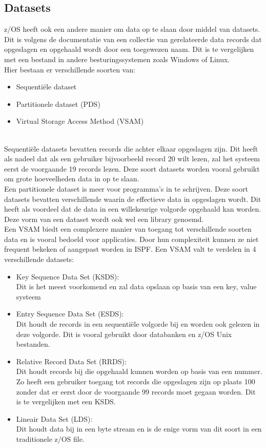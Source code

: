 \subsection{Datasets}
z/OS heeft ook een andere manier om data op te slaan door middel van datasets. Dit is volgens de documentatie van \textcite{IBM} een collectie van gerelateerde data records dat opgeslagen en opgehaald wordt door een toegewezen naam. Dit is te vergelijken met een bestand in andere besturingssystemen zoals Windows of Linux. \\

Hier bestaan er verschillende soorten van:

\begin{itemize}
    \item Sequentiële dataset
    \item Partitionele dataset (PDS)
    \item Virtual Storage Access Method (VSAM)
\end{itemize} \\

Sequentiële datasets bevatten records die achter elkaar opgeslagen zijn. Dit heeft als nadeel dat als een gebruiker bijvoorbeeld record 20 wilt lezen, zal het systeem eerst de voorgaande 19 records lezen. Deze soort datasets worden vooral gebruikt om grote hoeveelheden data in op te slaan. \autocite{IBM} \\

Een partitionele dataset is meer voor programma's in te schrijven. Deze soort datasets bevatten verschillende  waarin de effectieve data in opgeslagen wordt. Dit heeft als voordeel dat de data in een willekeurige volgorde opgehaald kan worden. Deze vorm van een dataset wordt ook wel een library genoemd. \autocite{IBM} \\

Een VSAM biedt een complexere manier van toegang tot verschillende soorten data en is vooral bedoeld voor applicaties. Door hun complexiteit kunnen ze niet frequent bekeken of aangepast worden in ISPF. Een VSAM valt te verdelen in 4 verschillende datasets:
\begin{itemize}
    \item Key Sequence Data Set (KSDS): \\Dit is het meest voorkomend en zal data opslaan op basis van een key, value systeem
    \item Entry Sequence Data Set (ESDS): \\Dit houdt de records in een sequentiële volgorde bij en worden ook gelezen in deze volgorde. Dit is vooral gebruikt door databanken en z/OS Unix bestanden.
    \item Relative Record Data Set (RRDS): \\Dit houdt records bij die opgehaald kunnen worden op basis van een nummer. Zo heeft een gebruiker toegang tot records die opgeslagen zijn op plaats 100 zonder dat er eerst door de voorgaande 99 records moet gegaan worden. Dit is te vergelijken met een KSDS.
    \item Lineair Data Set (LDS): \\Dit houdt data bij in een byte stream en is de enige vorm van dit soort in een traditionele z/OS file.
\end{itemize}
\autocite{IBM}
